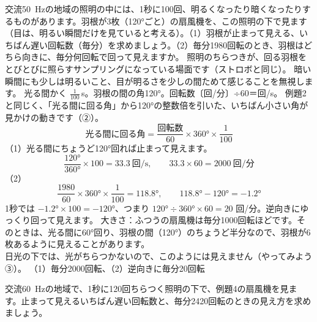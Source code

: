 \label{ph:波-11:ex4}
\begin{phreidai}[照明の下の扇風機]
交流\qty{50}{Hz}の地域の照明の中には、1秒に100回、明るくなったり暗くなったりするものがあります。羽根が3枚（\ang{120}ごと）の扇風機を、この照明の下で見ます（目は、明るい瞬間だけを見ていると考える）。（1）羽根が止まって見える、いちばん遅い回転数（毎分）を求めましょう。（2）毎分1980回転のとき、羽根はどちら向きに、毎分何回転で回って見えますか。
\phbamen
照明のちらつきが、回る羽根をとびとびに照らすサンプリングになっている場面です（ストロボと同じ）。
\phmushi
暗い瞬間にも少しは明るいこと、目が明るさを少しの間ためて感じることを無視します。
\phzu
光る間かく $\tfrac{1}{100}$\,s。羽根の間の角\ang{120}。回転数〔回/分〕÷60＝回/s。
\phriyu
例題2と同じく、「光る間に回る角」から\ang{120}の整数倍を引いた、いちばん小さい角が見かけの動きです（②）。
\phtateru
\[\text{光る間に回る角}=\frac{\text{回転数}}{60}\times360°\times\frac{1}{100}\]
\phtoku
（1）光る間にちょうど\ang{120}回れば止まって見えます。\[\frac{120°}{360°}\times100=33.3\ \text{回/s},\qquad 33.3\times60=2000\ \text{回/分}\]
（2）\[\frac{1980}{60}\times360°\times\frac{1}{100}=118.8°,\qquad118.8°-120°=-1.2°\]
1秒では $-1.2°\times100=-120°$、つまり $\ang{120}\div\ang{360}\times60=20$ 回/分。逆向きにゆっくり回って見えます。
\phtashikame
大きさ：ふつうの扇風機は毎分1000回転ほどです。そのときは、光る間に\ang{60}回り、羽根の間（\ang{120}）のちょうど半分なので、羽根が6枚あるように見えることがあります。\\
日光の下では、光がちらつかないので、このようには見えません（やってみよう③）。
\kotae （1）毎分2000回転、（2）逆向きに毎分20回転
\end{phreidai}
\begin{jibun}
交流\qty{60}{Hz}の地域で、1秒に120回ちらつく照明の下で、例題4の扇風機を見ます。止まって見えるいちばん遅い回転数と、毎分2420回転のときの見え方を求めましょう。
\end{jibun}

